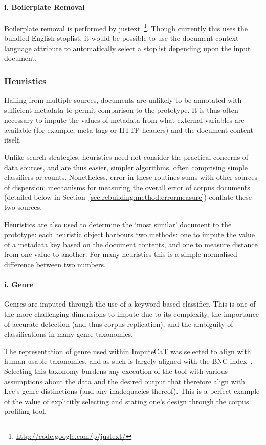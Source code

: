 \paragraph{i. Boilerplate Removal}
Boilerplate removal is performed by justext~\footnote{\url{http://code.google.com/p/justext/}}.  Though currently this uses the bundled English stoplist, it would be possible to use the document context language attribute to automatically select a stoplist depending upon the input document.




\subsubsection{Heuristics}
Hailing from multiple sources, documents are unlikely to be annotated with sufficient metadata to permit comparison to the prototype.  It is thus often necessary to impute the values of metadata from what external variables are available (for example, meta-tags or HTTP headers) and the document content itself.

Unlike search strategies, heuristics need not consider the practical concerns of data sources, and are thus easier, simpler algorithms, often comprising simple classifiers or counts.  Nonetheless, error in these routines sums with other sources of dispersion: mechanisms for measuring the overall error of corpus documents (detailed below in Section~\ref{sec:rebuilding:method:errormeasure}) conflate these two sources.

Heuristics are also used to determine the `most similar' document to the prototype: each heuristic object harbours two methods: one to impute the value of a metadata key based on the document contents, and one to measure distance from one value to another.  For many heuristics this is a simple normalised difference between two numbers.


\paragraph{i. Genre}
Genres are imputed through the use of a keyword-based classifier.  This is one of the more challenging dimensions to impute due to its complexity, the importance of accurate detection (and thus corpus replication), and the ambiguity of classifications in many genre taxonomies.

The representation of genre used within ImputeCaT was selected to align with human-usable taxonomies, and as such is largely aligned with the BNC index~\cite{lee2001genres}.  Selecting this taxonomy burdens any execution of the tool with various assumptions about the data and the desired output that therefore align with Lee's genre distinctions (and any inadequacies thereof).  This is a perfect example of the value of explicitly selecting and stating one's design through the corpus profiling tool.


